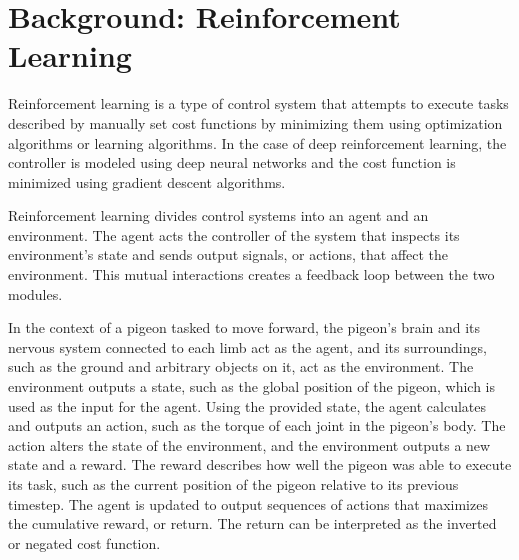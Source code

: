 \section{Background: Reinforcement Learning}
  Reinforcement learning is a type of control system that attempts to execute tasks described by manually set cost functions by minimizing them using optimization algorithms or learning algorithms. In the case of deep reinforcement learning, the controller is modeled using deep neural networks and the cost function is minimized using gradient descent algorithms.

  Reinforcement learning divides control systems into an agent and an environment. The agent acts the controller of the system that inspects its environment's state and sends output signals, or actions, that affect the environment. This mutual interactions creates a feedback loop between the two modules.

  In the context of a pigeon tasked to move forward, the pigeon's brain and its nervous system connected to each limb act as the agent, and its surroundings, such as the ground and arbitrary objects on it, act as the environment. The environment outputs a state, such as the global position of the pigeon, which is used as the input for the agent. Using the provided state, the agent calculates and outputs an action, such as the torque of each joint in the pigeon's body. The action alters the state of the environment, and the environment outputs a new state and a reward. The reward describes how well the pigeon was able to execute its task, such as the current position of the pigeon relative to its previous timestep. The agent is updated to output sequences of actions that maximizes the cumulative reward, or return. The return can be interpreted as the inverted or negated cost function.

